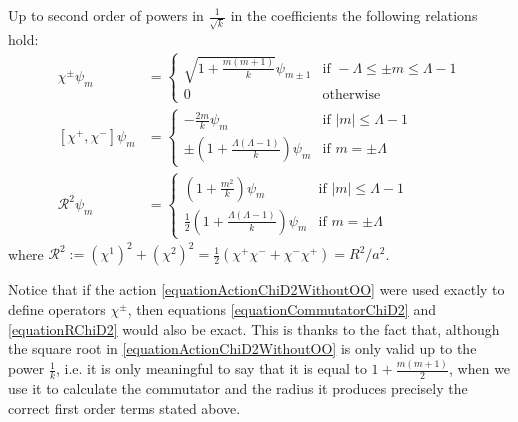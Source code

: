 \begin{proposition} Up to second order of powers in $\frac{1}{\sqrt{k}}$ in the coefficients the following relations hold:
\begin{align}\label{equationActionChiD2WithoutOO}
    \chi^\pm  \psi_m
        &= \begin{cases}
        \sqrt{1 + \frac{m(m+1)}{k}}  \psi_{m \pm 1} & \text{if } -\Lambda \leq \pm m \leq \Lambda -1
        \\
        0 & \text{otherwise}
        \end{cases}\\
    \label{equationCommutatorChiD2}
    [\chi^+, \chi^-]  \psi_m
        &= \begin{cases}
         -\frac{2m}{k} \psi_{m} & \text{if } |m| \leq \Lambda -1
        \\
        \pm \left( 1 + \frac{\Lambda(\Lambda-1)}{k} \right) \psi_{m} & \text{if } m = \pm \Lambda 
        \end{cases}\\
    \label{equationRChiD2}
    \mathcal R^2  \psi_m
        &= \begin{cases}
        \left( 1+ \frac{m^2}{k} \right) \psi_{m} & \text{if } |m| \leq \Lambda -1
        \\
        \frac{1}{2} \left( 1+ \frac{\Lambda(\Lambda-1)}{k} \right) \psi_{m} & \text{if } m = \pm \Lambda 
        \end{cases}
\end{align}
where $\mathcal R^2 := (\chi^1)^2 + (\chi^2)^2 = \frac{1}{2}(\chi^+\chi^- + \chi^-\chi^+)= R^2/a^2$.
\end{proposition}
\begin{remark}
Notice that if the action \eqref{equationActionChiD2WithoutOO} were used exactly to define operators $\chi^\pm$, then equations \eqref{equationCommutatorChiD2} and \eqref{equationRChiD2} would also be exact. This is thanks to the fact that, although the square root in \eqref{equationActionChiD2WithoutOO} is only valid up to the power $\frac{1}{k}$, i.e. it is only meaningful to say that it is equal to $ 1+\frac{m(m+1)}{2}$, when we use it to calculate the commutator and the radius it produces precisely the correct first order terms stated above.
\end{remark}

